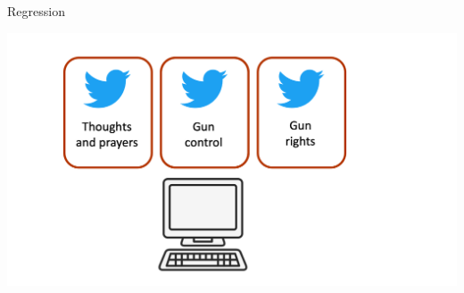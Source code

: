 \documentclass[handout]{beamer}
\begin{document}
\begin{frame}{Regression}
	
	\begin{center}
		\includegraphics{../pictures/Zhangetal_2.png} \\\
	\end{center}

	\begin{tiny}
	\end{tiny}
	
	
\end{frame}
\end{document}
